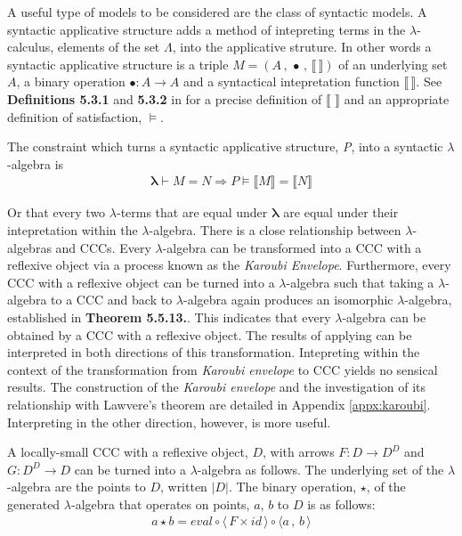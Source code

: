 A useful type of models to be considered are the class of syntactic models. A
syntactic applicative structure adds a method of intepreting terms in the
$\lambda$-calculus, elements of the set $\Lambda$, into the applicative
struture. In other words a syntactic applicative structure is a triple $M = (A
\, , \, \bullet \, , \, \llbracket \, \rrbracket)$ of an underlying set $A$, a
binary operation $\bullet : A \rightarrow A$ and a syntactical intepretation
function $\llbracket \, \rrbracket$. See \textbf{Definitions 5.3.1} and
\textbf{5.3.2} in \cite{barendregt1992lambda} for a precise definition of
$\llbracket \, \, \rrbracket$ and an appropriate definition of satisfaction,
$\vDash$.

The constraint which turns a syntactic applicative structure, \textit{P}, into a
syntactic $\lambda$-algebra is
\begin{align*}
    \bm{\lambda} \vdash M = N \Rightarrow P \models \llbracket M \rrbracket = \llbracket N
    \rrbracket
\end{align*}

Or that every two $\lambda$-terms that are equal under $\bm{\lambda}$ are equal
under their intepretation within the $\lambda$-algebra. There is a close
relationship between $\lambda$-algebras and CCCs. Every $\lambda$-algebra can
be transformed into a CCC with a reflexive object via a process known as the
\textit{Karoubi Envelope}. Furthermore, every CCC with a
reflexive object can be turned into a $\lambda$-algebra such that taking a
$\lambda$-algebra to a CCC and back to $\lambda$-algebra again produces an
isomorphic $\lambda$-algebra, established in \textbf{Theorem 5.5.13.}. This indicates that every $\lambda$-algebra can be
obtained by a CCC with a reflexive object. The results of applying
 can be interpreted in both directions of this transformation.
Intepreting within the context of the transformation from \textit{Karoubi
envelope} to CCC yields no sensical results. The construction of the
\textit{Karoubi envelope} and the investigation of its relationship with
Lawvere's theorem are detailed in Appendix \ref{appx:karoubi}. Interpreting in
the other direction, however, is more useful.

A locally-small CCC with a reflexive object, $D$, with arrows $F : D
\rightarrow D^D$ and $G : D^D \rightarrow D$ can be turned into a
$\lambda$-algebra as follows. The underlying set of the $\lambda$-algebra are
the points to $D$, written $|D|$. The binary operation, $\star$, of the
generated $\lambda$-algebra that operates on points, $a$, $b$ to $D$ is as
follows:
\begin{align*}
    a \star b = eval \circ \langle \, F \times id \, \rangle \circ \langle a \,
    , \, b \,
    \rangle
\end{align*}

